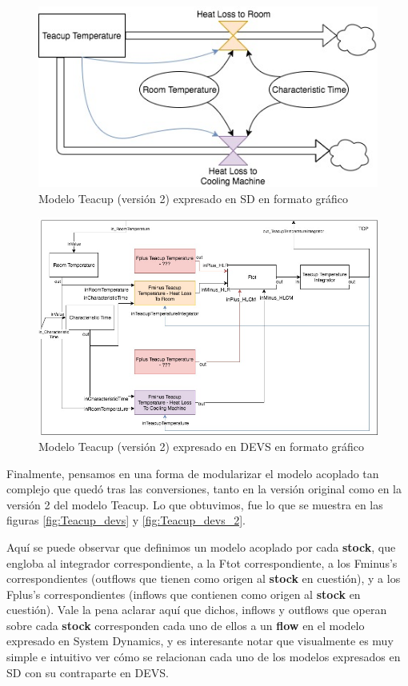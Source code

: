\begin{figure}[!h]
\centering
\includegraphics[scale=0.4]{imagenes/Teacup_sd_2}
\caption{Modelo Teacup (versión 2) expresado en SD en formato gráfico}
\label{fig:Teacup_sd_2}
\end{figure}

\begin{figure}[!h]
\centering
\includegraphics[scale=0.4]{imagenes/Teacup_devs_flattened_2}
\caption{Modelo Teacup (versión 2) expresado en DEVS en formato gráfico}
\label{fig:Teacup_devs_flattened_2}
\end{figure}

Finalmente, pensamos en una forma de modularizar el modelo acoplado tan complejo que quedó tras las conversiones, tanto en la versión original como en la versión 2 del modelo Teacup. Lo que obtuvimos, fue lo que se muestra en las figuras \ref{fig:Teacup_devs} y \ref{fig:Teacup_devs_2}.

Aquí se puede observar que definimos un modelo acoplado por cada \textbf{stock}, que engloba al integrador correspondiente, a la Ftot correspondiente, a los Fminus's correspondientes (outflows que tienen como origen al \textbf{stock} en cuestión), y a los Fplus's correspondientes (inflows que contienen como origen al \textbf{stock} en cuestión). Vale la pena aclarar aquí que dichos, inflows y outflows que operan sobre cada \textbf{stock} corresponden cada uno de ellos a un \textbf{flow} en el modelo expresado en System Dynamics, y es interesante notar que visualmente es muy simple e intuitivo ver cómo se relacionan cada uno de los modelos expresados en SD con su contraparte en DEVS. 

